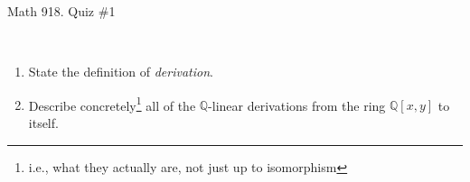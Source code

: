 \documentclass[12pt]{amsart}
\newcommand{\Q}{\mathbb{Q}}
\begin{document}
	
	\thispagestyle{empty}
	
	\begin{center}
		\Large{Math 918. Quiz \#1 }\\

	\end{center}
	
	

	
	\
	
	\begin{enumerate}
	
	
	
	\item State the definition of \emph{derivation}.
	
	\vfill
	
	\item Describe concretely\footnote{i.e., what they actually are, not just up to isomorphism}  all of the $\Q$-linear derivations from the ring $\Q[x,y]$ to itself. 
	
	\vfill
	
	\end{enumerate}
	
	
	
\end{document}
